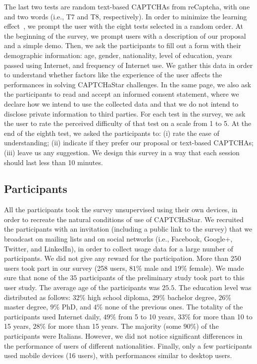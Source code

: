 \documentclass[conference]{IEEEtran}
\newcommand{\hilight}[1]{#1}
\begin{document}
The last two tests are \hilight{random} text-based CAPTCHAs from reCaptcha, with one and two words (i.e., T7 and T8, respectively). 
In order to minimize the learning effect~\cite{kosara2003user}, we prompt the user with the eight tests selected in a random order.
At the beginning of the survey, we prompt users with a description of our proposal and a simple demo.
Then, we ask the participants to fill out a form with their demographic information: age, gender, nationality, level of education, years passed using Internet, and frequency of Internet use. 
We gather this data in order to understand whether factors like the experience of the user affects the performances in solving CAPTCHaStar challenges.
In the same page, we also ask the participants to read and accept an informed consent statement, where we declare how we intend to use the collected data and that we do not intend to disclose private information to third parties.
\hilight{For each test in the survey, we ask the user to rate the perceived difficulty of that test on a scale from 1 to 5.}
At the end of the eighth test, we asked the participants to: (i) rate the ease of understanding; (ii) indicate if they prefer our proposal or text-based CAPTCHAs; (iii) leave us any suggestion.
We design this survey in a way that each session should last less than 10 minutes. \subsection{Participants}
All the participants took the survey unsupervised using their own devices, in order to recreate the natural conditions of use of CAPTCHaStar.
We recruited the participants with an invitation (including a public link to the survey) that we broadcast on mailing lists and on social networks (i.e., Facebook, Google+, Twitter, and LinkedIn), in order to collect usage data for a large number of participants.
We did not give any reward for the participation.
More than $250$ users took part in our survey (\hilight{258 users, }$81\%$ male and $19\%$ female). 
We made sure that none of the $35$ participants of the preliminary study took part to this user study.
The average age of the participants was $25.5$. The education level was distributed as follows: $32\%$ high school diploma, $29\%$ bachelor degree, $26\%$ master degree, $9\%$ PhD, and $4\%$ none of the previous ones.
The totality of the participants used Internet daily,  $49\%$ from 5 to 10 years, $33\%$ for more than 10 to 15 years, $28\%$ for more than 15 years.
The majority (some $90\%$) of the participants were Italians. \hilight{However, we did not notice significant differences in the performance of users of different nationalities}. 
\hilight{Finally, only a few participants used mobile devices (16 users), with performances similar to desktop users.}
\end{document}
